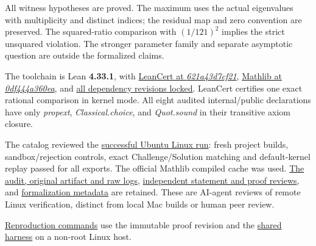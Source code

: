 \documentclass[11pt,a4paper]{article}
\begin{document}
All witness hypotheses are proved. The maximum uses the actual
eigenvalues with multiplicity and distinct indices; the residual map and
zero convention are preserved. The squared-ratio comparison with
\((1/121)^2\) implies the strict unsquared violation. The stronger
parameter family and separate asymptotic question are outside the
formalized claims.

The toolchain is Lean \textbf{4.33.1}, with
\href{https://github.com/alerad/leancert/tree/621a43d7cf21f87872392a01e874f2f1dbddc926}{LeanCert
at \textit{621a43d7cf21}},
\href{https://github.com/leanprover-community/mathlib4/tree/0df444a360eaa60ab8c11dca51a86af692955474}{Mathlib
at \textit{0df444a360ea}}, and
\href{https://github.com/sgstepaniants/OpenProblemsInNLA/blob/7b8512e21c50adc8597dcdbed32f2aec13c3b43e/linear-systems-and-elimination/IE-18/lean/lake-manifest.json}{all
dependency revisions locked}. LeanCert certifies one exact rational
comparison in kernel mode. All eight audited internal/public
declarations have only \textit{propext}, \textit{Classical.choice}, and
\textit{Quot.sound} in their transitive axiom closure.

The catalog reviewed the
\href{https://github.com/sgstepaniants/OpenProblemsInNLA/actions/runs/34703657954}{successful
Ubuntu Linux run}: fresh project builds, sandbox/rejection controls,
exact Challenge/Solution matching and default-kernel replay passed for
all exports. The official Mathlib compiled cache was used.
\href{https://github.com/ajt60gaibb/OpenProblemsInNLA/blob/main/linear-systems-and-elimination/IE-18/lean/verification/linux-2026-09-12}{The
audit, original artifact and raw logs},
\href{https://github.com/ajt60gaibb/OpenProblemsInNLA/blob/main/linear-systems-and-elimination/IE-18/lean/reviews}{independent
statement and proof reviews}, and
\href{https://github.com/ajt60gaibb/OpenProblemsInNLA/blob/main/linear-systems-and-elimination/IE-18/lean/formalization.yaml}{formalization
metadata} are retained. These are AI-agent reviews of remote Linux
verification, distinct from local Mac builds or human peer review.

\href{https://github.com/ajt60gaibb/OpenProblemsInNLA/blob/main/linear-systems-and-elimination/IE-18/lean/README.md\#reproduction-and-evidence}{Reproduction
commands} use the immutable proof revision and the
\href{https://github.com/ajt60gaibb/OpenProblemsInNLA/blob/main/tools/lean/HARNESS.md}{shared
harness} on a non-root Linux host.
\end{document}
